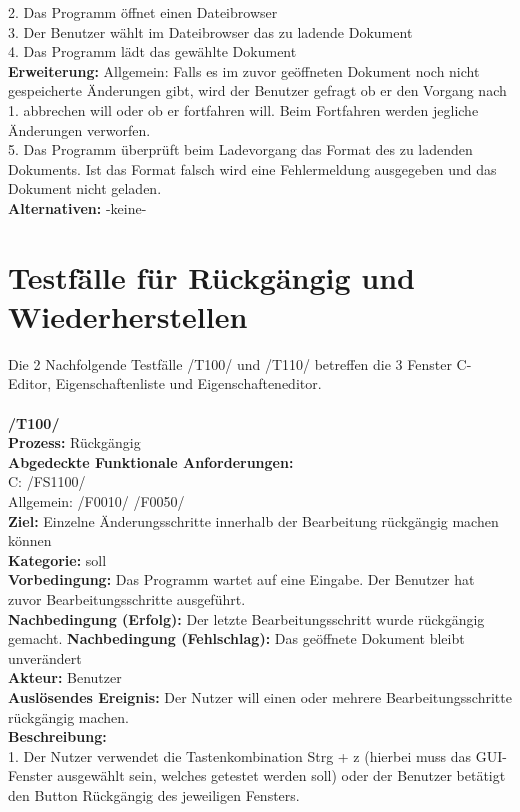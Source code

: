 \documentclass[a4paper]{scrreprt}
\begin{document}
2. Das Programm öffnet einen Dateibrowser\\
3. Der Benutzer wählt im Dateibrowser das zu ladende Dokument \\
4. Das Programm lädt das gewählte Dokument \\
\textbf {Erweiterung:} Allgemein: Falls es im zuvor geöffneten Dokument noch nicht gespeicherte Änderungen gibt, wird der Benutzer gefragt ob er den Vorgang nach 1. abbrechen will oder ob er fortfahren will. Beim Fortfahren werden jegliche Änderungen verworfen. \\
5. Das Programm überprüft beim Ladevorgang das Format des zu ladenden Dokuments. Ist das Format falsch wird eine Fehlermeldung ausgegeben und das Dokument nicht geladen. \\
\textbf {Alternativen:} -keine- 
\section{Testfälle für Rückgängig und Wiederherstellen}
Die 2 Nachfolgende Testfälle /T100/ und /T110/ betreffen die 3 Fenster C-Editor, Eigenschaftenliste und Eigenschafteneditor. \\\\
\textbf{/T100/} \\ 
\textbf{Prozess: }Rückgängig \\
\textbf{Abgedeckte Funktionale Anforderungen:}\\
C: /FS1100/ \\
Allgemein: /F0010/ /F0050/ \\
\textbf{Ziel:} Einzelne Änderungsschritte innerhalb der Bearbeitung rückgängig machen können\\
\textbf{Kategorie:} soll\\
\textbf{Vorbedingung:} Das Programm wartet auf eine Eingabe. Der Benutzer hat zuvor Bearbeitungsschritte ausgeführt. \\
\textbf{Nachbedingung (Erfolg):} Der letzte Bearbeitungsschritt wurde rückgängig gemacht.
\textbf{Nachbedingung (Fehlschlag):} Das geöffnete Dokument bleibt unverändert\\
\textbf{Akteur:} Benutzer\\
\textbf{Auslösendes Ereignis:} Der Nutzer will einen oder mehrere Bearbeitungsschritte rückgängig machen.\\
\textbf{Beschreibung:} \\
1. Der Nutzer verwendet die Tastenkombination Strg + z (hierbei muss das GUI-Fenster ausgewählt sein, welches getestet werden soll) oder der Benutzer betätigt den Button Rückgängig des jeweiligen Fensters.\\
\end{document}
